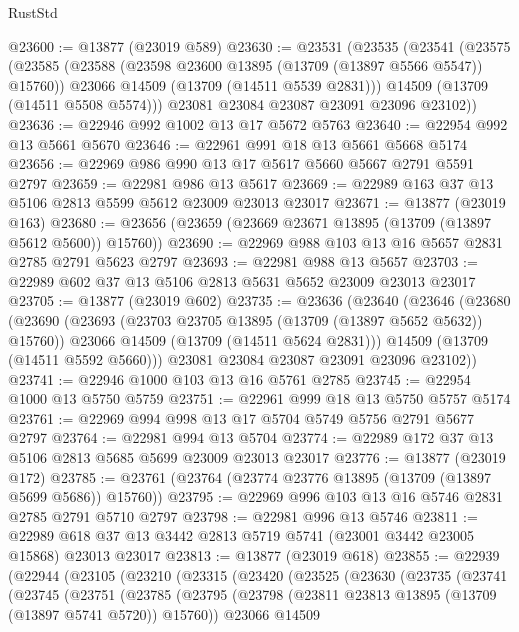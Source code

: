 \begin{lexlean}{RustStd}
\begin{coremodule}
@23600 := @13877 (@23019 @589)
@23630 := @23531
    (@23535
      (@23541
        (@23575
          (@23585
            (@23588 (@23598 @23600 @13895 (@13709 (@13897 @5566 @5547)) @15760))
            @23066
            @14509
            (@13709 (@14511 @5539 @2831)))
          @14509
          (@13709 (@14511 @5508 @5574)))
        @23081
        @23084
        @23087
        @23091
        @23096
        @23102))
@23636 := @22946 @992 @1002 @13 @17 @5672 @5763
@23640 := @22954 @992 @13 @5661 @5670
@23646 := @22961 @991 @18 @13 @5661 @5668 @5174
@23656 := @22969 @986 @990 @13 @17 @5617 @5660 @5667 @2791 @5591 @2797
@23659 := @22981 @986 @13 @5617
@23669 := @22989 @163 @37 @13 @5106 @2813 @5599 @5612 @23009 @23013 @23017
@23671 := @13877 (@23019 @163)
@23680 := @23656 (@23659 (@23669 @23671 @13895 (@13709 (@13897 @5612 @5600)) @15760))
@23690 := @22969 @988 @103 @13 @16 @5657 @2831 @2785 @2791 @5623 @2797
@23693 := @22981 @988 @13 @5657
@23703 := @22989 @602 @37 @13 @5106 @2813 @5631 @5652 @23009 @23013 @23017
@23705 := @13877 (@23019 @602)
@23735 := @23636
    (@23640
      (@23646
        (@23680
          (@23690
            (@23693 (@23703 @23705 @13895 (@13709 (@13897 @5652 @5632)) @15760))
            @23066
            @14509
            (@13709 (@14511 @5624 @2831)))
          @14509
          (@13709 (@14511 @5592 @5660)))
        @23081
        @23084
        @23087
        @23091
        @23096
        @23102))
@23741 := @22946 @1000 @103 @13 @16 @5761 @2785
@23745 := @22954 @1000 @13 @5750 @5759
@23751 := @22961 @999 @18 @13 @5750 @5757 @5174
@23761 := @22969 @994 @998 @13 @17 @5704 @5749 @5756 @2791 @5677 @2797
@23764 := @22981 @994 @13 @5704
@23774 := @22989 @172 @37 @13 @5106 @2813 @5685 @5699 @23009 @23013 @23017
@23776 := @13877 (@23019 @172)
@23785 := @23761 (@23764 (@23774 @23776 @13895 (@13709 (@13897 @5699 @5686)) @15760))
@23795 := @22969 @996 @103 @13 @16 @5746 @2831 @2785 @2791 @5710 @2797
@23798 := @22981 @996 @13 @5746
@23811 := @22989 @618 @37 @13 @3442 @2813 @5719 @5741 (@23001 @3442 @23005 @15868) @23013 @23017
@23813 := @13877 (@23019 @618)
@23855 := @22939
    (@22944
      (@23105
        (@23210
          (@23315
            (@23420
              (@23525
                (@23630
                  (@23735
                    (@23741
                      (@23745
                        (@23751
                          (@23785
                            (@23795
                              (@23798 (@23811 @23813 @13895 (@13709 (@13897 @5741 @5720)) @15760))
                              @23066
                              @14509

\end{coremodule}
\end{lexlean}
